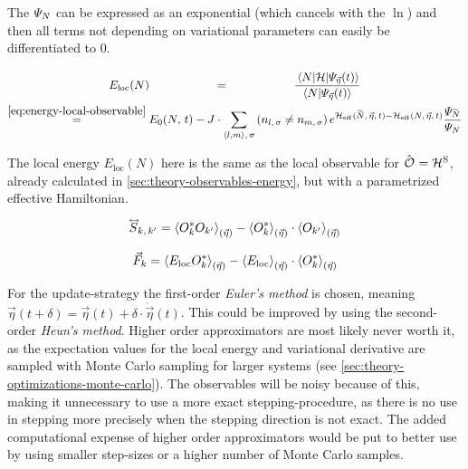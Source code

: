 The $\psiN$ can be expressed as an exponential (which cancels with the $\ln$) and then all terms not depending on variational parameters can easily be differentiated to 0.

\begin{equation}
    \label{eq:local-energy-definition}
    \begin{gathered}
        E_\text{loc}(N) \stackrel{\phantom{\ref{eq:energy-local-observable}}}{=} \frac{
            \bracketHelper{N}{\hamiltonian}{\psiEta{\vec{\eta}}{t}}
        }{
            \braketHelper{N}{\psiEta{\vec{\eta}}{t}}
        } 
        \\
        \stackrel{\ref{eq:energy-local-observable}}{=}
        E_0(N,\,t)-
        J \cdot \neighborsumWSpin{l}{m}{\sigma}
        \left(n_{l,\,\sigma} \neq n_{m,\,\sigma}\right)
            e^{\HeffOft[\vphantom{N}\smash{\tilde{N}},\,\vec{\eta}]-\HeffOft[N,\,\vec{\eta}]}
        \frac{
            \psiN[\vphantom{N}\smash{\tilde{N}}]
        }{
            \psiN[N]
        }
    \end{gathered}
\end{equation}

The local energy $E_\text{loc}(N)$ here is the same as the local observable  for $\ObservableOp = \pictureHamiltonian[\schroedingerPicture]$, already calculated in \autoref{sec:theory-observables-energy}, but with a parametrized effective Hamiltonian.

\begin{equation}
    \label{eq:covariance-matrix}
    \matvec{S}_{k,\, k'} = \timelessEtaExpectationVal{O_{k}^\ast O_{k'}} - \timelessEtaExpectationVal{O_{k}^\ast} \cdot \timelessEtaExpectationVal{O_{k'} \vphantom{O_{k}^\ast}}
\end{equation}

\begin{equation}
    \label{eq:tdvp-force}
    \vec{F}_k = \timelessEtaExpectationVal{E_\text{loc} O_{k}^\ast} - \timelessEtaExpectationVal{E_\text{loc}  \vphantom{O_{k}^\ast}} \cdot \timelessEtaExpectationVal{O_{k}^\ast}
\end{equation}


For the update-strategy the first-order \emph{Euler's method} is chosen, meaning $\vec{\eta}(t + \delta) = \vec{\eta}(t) + \delta \cdot \dot{\vec{\eta}}(t)$.
This could be improved by using the second-order \emph{Heun's method}. 
Higher order approximators are most likely never worth it, as the expectation values for the local energy and variational derivative are sampled with Monte Carlo sampling for larger systems (see \autoref{sec:theory-optimizations-monte-carlo}).
The observables will be noisy because of this, making it unnecessary to use a more exact stepping-procedure, as there is no use in stepping more precisely when the stepping direction is not exact.
The added computational expense of higher order approximators would be put to better use by using smaller step-sizes or a higher number of Monte Carlo samples.

